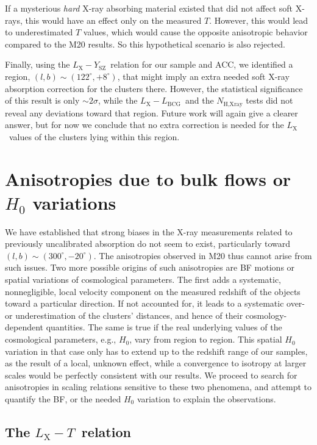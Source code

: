 \documentclass{aa}   %
\newcommand{\LT}{$L_{\text{X}}-T$}
\newcommand{\LY}{$L_{\text{X}}-Y_{\text{SZ}}$}
\newcommand{\LxLbcg}{$L_{\text{X}}-L_{\text{BCG}}$}
\newcommand{\Lx}{$L_{\text{X}}$}
\begin{document}
If a mysterious \emph{hard} X-ray absorbing material existed that did not affect soft X-rays, this would have an effect only on the measured $T$. However, this would lead to underestimated $T$ values, which would cause the opposite anisotropic behavior compared to the M20 results. So this hypothetical scenario is also rejected.

Finally, using the \LY\ relation for our sample and ACC, we identified a region, $(l,b)\sim (122^{\circ},+8^{\circ})$, that might imply an extra needed soft X-ray absorption correction for the clusters there. However, the statistical significance of this result is only $\sim 2\sigma$, while the \LxLbcg\ and the $N_{\text{H,Xray}}$ tests did not reveal any deviations toward that region. Future work will again give a clearer answer, but for now we conclude that no extra correction is needed for the \Lx\ values of the clusters lying within this region.

\section{Anisotropies due to bulk flows or $H_0$ variations}\label{bf_cosmo_anisot}

We have established that strong biases in the X-ray measurements related to previously uncalibrated absorption do not seem to exist, particularly toward $(l,b)\sim (300^{\circ},-20^{\circ})$. The anisotropies observed in M20 thus cannot arise from such issues. Two more possible origins of such anisotropies are BF motions or spatial variations of cosmological parameters. The first adds a systematic, nonnegligible, local velocity component on the measured redshift of the objects toward a particular direction. If not accounted for, it leads to a systematic over- or underestimation of the clusters' distances, and hence of their cosmology-dependent quantities. The same is true if the real underlying values of the cosmological parameters, e.g., $H_0$, vary from region to region. This spatial $H_0$ variation in that case only has to extend up to the redshift range of our samples, as the result of a local, unknown effect, while a convergence to isotropy at larger scales would be perfectly consistent with our results. We proceed to search for anisotropies in scaling relations sensitive to these two phenomena, and attempt to quantify the BF, or the needed $H_0$ variation to explain the observations.

\subsection{The \LT\ relation}
\end{document}
